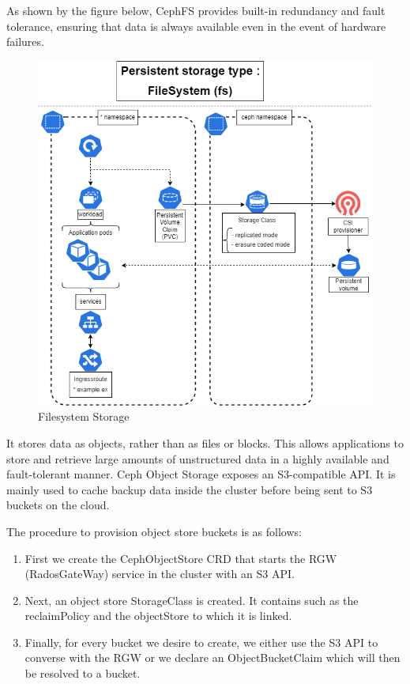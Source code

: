 As shown by the figure below, CephFS provides built-in redundancy and fault tolerance, ensuring that data is always available even in the event of hardware failures. 
\begin{figure}[H]\centering
\includegraphics[width=1.0\textwidth,angle=00]{assets/f31.png}
\caption{Filesystem Storage}
\label{fig:Filesystem Storage}
\end{figure}
\newpage
{}

It stores data as objects, rather than as files or blocks. This allows applications to store and retrieve large amounts of unstructured data in a highly available and fault-tolerant manner. Ceph Object Storage exposes an S3-compatible API. It is mainly used to cache backup data inside the cluster before being sent to S3 buckets on the cloud.

The procedure to provision object store buckets is as follows: 

\begin{enumerate}[label = (\arabic*)]
    \item First we create the CephObjectStore CRD that starts the RGW (RadosGateWay) service in the cluster with an S3 API. 
    \item Next, an object store StorageClass is created. It contains such as the reclaimPolicy and the objectStore to which it is linked. 
    \item Finally, for every bucket we desire to create, we either use the S3 API to converse with the RGW or we declare an ObjectBucketClaim which will then be resolved to a bucket. 
\end{enumerate}


